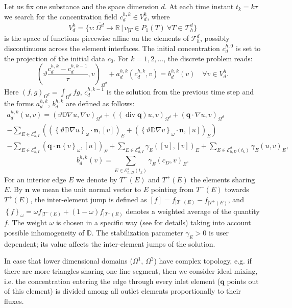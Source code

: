 \documentclass[a4paper]{article}
\def\avg#1{\left\{#1\right\}_\omega}
\def\D{{\tn D}}
\def\div{\operatorname{div}}
\def\Ehdir{\mathcal E_{h,D}}         %
\def\Ehint{\mathcal E_{h,I}}       %
\def\jmp#1{[#1]}
\def\n{\vc n}
\def\vc#1{\mathbf{\boldsymbol{#1}}}     %
\def\R{\mathbb R}
\def\sc#1#2{\left(#1,#2\right)}
\def\Th{\mathcal T_h}       %
\def\th{\vartheta}
\def\tn#1{{\mathbb{#1}}}    %
\def\where{\,|\,}
\begin{document}
Let us fix one substance and the space dimension $d$.
At each time instant $t_k=k\tau$ we search for the concentration field $c_d^{h,k}\in V_d^h$, where
$$ V_d^h = \{v:\overline{\Omega^d}\to\R\where v_{|T}\in P_1(T)~\forall T\in\Th^d\} $$
is the space of functions piecewise affine on the elements of $\Th^d$, possibly discontinuous across the element interfaces.
The initial concentration $c^{h,0}_d$ is set to the projection of the initial data $c_0$.
For $k=1,2,\ldots$, the discrete problem reads:
$$ \sc{\th\frac{c_d^{h,k}-c^{h,k-1}_d}\tau}{v}_{\Omega^d} + a^{h,k}_d(c^{h,k}_d,v) = b^{h,k}_d(v) \quad \forall v\in V^h_d. $$
Here $\sc{f}{g}_{\Omega^d}=\int_{\Omega^d} f g$, $c^{h,k-1}_d$ is the solution from the previous time step and the forms $a^{h,k}_d$, $b^{h,k}_d$ are defined as follows:
\begin{multline*}
a^{h,k}_d(u,v) = \sc{\th\D\nabla u}{\nabla v}_{\Omega^d}
+ \sc{(\div\vc q)u}{v}_{\Omega^d}
+ \sc{\vc q\cdot\nabla u}{v}_{\Omega^d}\\
- \sum_{E\in\Ehint^d}\left(\sc{\avg{\th\D\nabla u}\cdot\n}{\jmp{v}}_E + \sc{\avg{\th\D\nabla v}\cdot\n}{\jmp{u}}_E\right)\\
- \sum_{E\in\Ehint^d}\sc{\vc q\cdot\n\avg{v}}{\jmp{u}}_E
+ \sum_{E\in\Ehint^d}\gamma_E\sc{\jmp{u}}{\jmp{v}}_E
+ \sum_{E\in\Ehdir^d(t_k)}\gamma_E\sc{u}{v}_E,
\end{multline*}
% 
\begin{equation*}
b^{h,k}_d(v) = \sum_{E\in\Ehdir^d(t_k)}\gamma_E\sc{c_D}{v}_E.
\end{equation*}
For an interior edge $E$ we denote by $T^-(E)$ and $T^+(E)$ the elements sharing $E$.
By $\n$ we mean the unit normal vector to $E$ pointing from $T^-(E)$ towards $T^+(E)$, the inter-element jump is defined as $\jmp{f}=f_{|T^-(E)}-f_{|T^+(E)}$, and $\avg{f}=\omega f_{|T^-(E)} + (1-\omega) f_{|T^+(E)}$ denotes a weighted average of the quantity $f$.
The weight $\omega$ is chosen in a specific way (see \cite{ern_stephansen_zunino} for details) taking into account possible inhomogeneity of $\D$.
The stabilization parameter $\gamma_E>0$ is user dependent; its value affects the inter-element jumps of the solution.

In case that lower dimensional domains ($\Omega^1$, $\Omega^2$) have complex topology, e.g. if there are more triangles sharing one line segment, then we consider ideal mixing, i.e. the concentration entering the edge through every inlet element ($\vc q$ points out of this element) is divided among all outlet elements proportionally to their fluxes.
\end{document}
